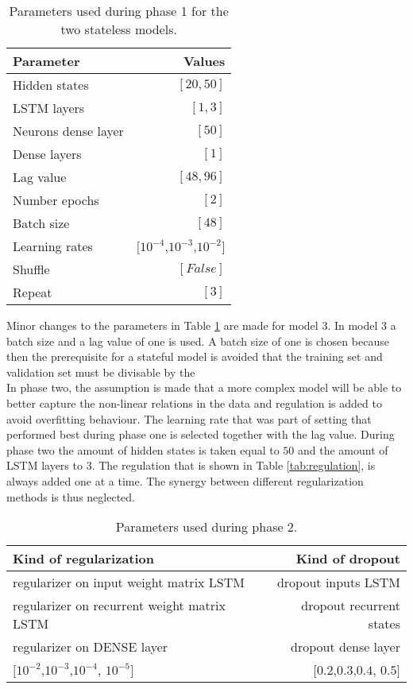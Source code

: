\begin{table}[ht]
	\centering
	\begin{tabular}{@{}l|r@{}} \toprule
		\textbf{Parameter}	& \textbf{Values}\\\midrule
		Hidden states &  $ [20,50] $\\
		LSTM layers & $ [1,3] $\\
		Neurons dense layer & $ [50] $\\
		Dense layers & $ [1] $\\
		Lag value & $ [48,96] $\\
		Number epochs & $ [2] $\\
		Batch size & $ [48] $\\
		Learning rates & $[ 10^{-4} $,$ 10^{-3} $,$ 10^{-2} ]$\\
		Shuffle & $ [False] $\\
		Repeat & $ [3] $\\\bottomrule
	\end{tabular}
	\caption{Parameters used during phase 1 for the two stateless models.}
	\label{tab:para_phase1}
\end{table}

Minor changes to the parameters in Table \ref{tab:para_phase1} are made for model 3. In model 3 a batch size and a lag value of one is used. A batch size of one is chosen because then the prerequisite for a stateful model is avoided that the training set and validation set must be divisable by the \\

In phase two, the assumption is made that a more complex model will be able to better capture the non-linear relations in the data and regulation is added to avoid overfitting behaviour. The learning rate that was part of setting that performed best during phase one is selected together with the lag value. During phase two the amount of hidden states is taken equal to $ 50 $ and the amount of LSTM layers to $ 3 $. The regulation that is shown in Table \ref{tab:regulation}, is always added one at a time. The synergy between different regularization methods is thus neglected. 

\begin{table}[ht]
	\centering
	\begin{tabular}{@{}l|r@{}} \toprule
		\textbf{Kind of regularization} & 	\textbf{Kind of dropout}\\\hline
		regularizer on input weight matrix LSTM 	& dropout inputs LSTM\\\hline
		regularizer on recurrent weight matrix LSTM & dropout recurrent states\\\hline
		regularizer on DENSE layer & dropout dense layer\\\hline
		$[ 10^{-2} $,$ 10^{-3} $,$ 10^{-4}$, $ 10^{-5} ]$ & $[ 0.2 $,$ 0.3 $,$ 0.4$, $ 0.5 ]$\\\bottomrule
\end{tabular}
\caption{Parameters used during phase 2.}
\label{tab:para_phase2}
\end{table}


